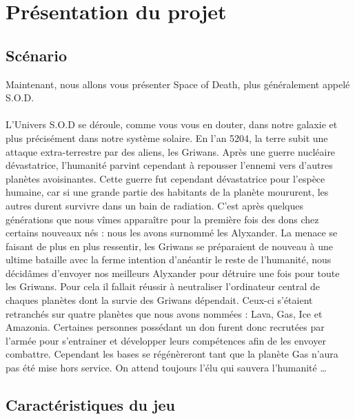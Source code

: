 \documentclass[12pt]{article}
\begin{document}
\newpage
\section{Présentation du projet}

\subsection{Scénario}

Maintenant, nous allons vous présenter Space of Death, plus généralement appelé S.O.D. \\\\
L’Univers S.O.D se déroule, comme vous vous en douter, dans notre galaxie et plus précisément dans notre système solaire. En l’an 5204, la terre subit une attaque extra-terrestre par des aliens, les Griwans. Après une guerre nucléaire dévastatrice, l’humanité parvint cependant à repousser l’ennemi vers d’autres planètes avoisinantes. Cette guerre fut cependant dévastatrice pour l’espèce humaine, car si une grande partie des habitants de la planète moururent, les autres durent survivre dans un bain de radiation. C’est après quelques générations que nous vîmes apparaître pour la première fois des dons chez certains nouveaux nés : nous les avons surnommé les Alyxander. La menace se faisant de plus en plus ressentir, les Griwans se préparaient de nouveau à une ultime bataille avec la ferme intention d’anéantir le reste de l’humanité, nous décidâmes d’envoyer nos meilleurs Alyxander pour détruire une fois pour toute les Griwans. Pour cela il fallait réussir à neutraliser l’ordinateur central de chaques planètes dont la survie des Griwans dépendait. Ceux-ci s’étaient retranchés sur quatre planètes que nous avons nommées : Lava, Gas, Ice et Amazonia. Certaines personnes possédant un don furent donc recrutées par l’armée pour s’entrainer et développer leurs compétences afin de les envoyer combattre. Cependant les bases se régénèreront tant que la planète Gas n’aura pas été mise hors service. On attend toujours l’élu qui sauvera l’humanité … 

\subsection{Caractéristiques du jeu}
\end{document}
